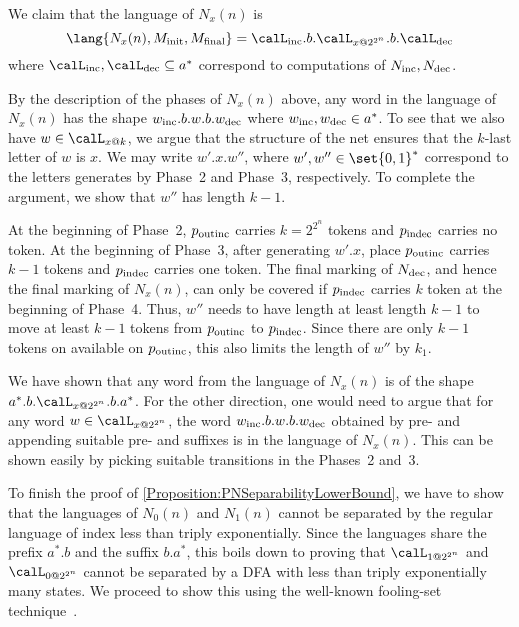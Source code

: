 \documentclass[../../diss.tex]{subfiles}
\begin{document}
We claim that the language of $N_x(n)$ is
\[
    \lang{N_x(n),\Minit,\Mfinal} = \calL_\textinc.b.\calL_{x @ 2^{2^n}}.b.\calL_\textdec
\]
where $\calL_\textinc, \calL_\textdec \subseteq a^*$ correspond to computations of $N_{\text{inc}},N_{\text{dec}}$.

By the description of the phases of $N_x(n)$ above, any word in the language of $N_x(n)$ has the shape $w_{\text{inc}}.b.w.b.w_{\text{dec}}$ where $w_{\text{inc}},w_{\text{dec}} \in a^*$.
To see that we also have $w \in \calL_{x @ k}$, we argue that the structure of the net ensures that the $k$-last letter of $w$ is $x$.
We may write $w'.x.w''$, where $w',w'' \in \set{0,1}^*$ correspond to the letters generates by Phase~2 and Phase~3, respectively.
To complete the argument, we show that $w''$ has length $k-1$.

At the beginning of Phase~2, $p_{\text{outinc}}$ carries $k = 2^{2^n}$ tokens and $p_{\text{indec}}$ carries no token.
At the beginning of Phase~3, \ie after generating $w'.x$, place $p_{\text{outinc}}$ carries $k-1$ tokens and $p_{\text{indec}}$ carries one token.
The final marking of $N_{\text{dec}}$, and hence the final marking of $N_x(n)$, can only be covered if $p_{\text{indec}}$ carries $k$ token at the beginning of Phase~4.
Thus, $w''$ needs to have length at least length $k-1$ to move at least $k-1$ tokens from $p_{\text{outinc}}$ to $p_{\text{indec}}$.
Since there are only $k-1$ tokens on available on $p_{\text{outinc}}$, this also limits the length of $w''$ by $k_1$.

We have shown that any word from the language of $N_x(n)$ is of the shape $a^*.b.\calL_{x @ 2^{2^n}}.b.a^*$.
For the other direction, one would need to argue that for any word $w \in \calL_{x @ 2^{2^n}}$, the word $w_{\text{inc}}.b.w.b.w_{\text{dec}}$ obtained by pre- and appending suitable pre- and suffixes is in the language of $N_x(n)$.
This can be shown easily by picking suitable transitions in the Phases~2 and~3.

To finish the proof of \cref{Proposition:PNSeparabilityLowerBound}, we have to show that the languages of $N_0(n)$ and $N_1(n)$ cannot be separated by the regular language of index less than triply exponentially.
Since the languages share the prefix $a^*.b$ and the suffix $b.a^*$, this boils down to proving that $\calL_{1 @ {2^{2^n}}}$ and $\calL_{0 @ {2^{2^n}}}$ cannot be separated by a DFA with less than triply exponentially many states.
We proceed to show this using the well-known fooling-set technique~\cite{Birget92,Birget93}.
\end{document}
